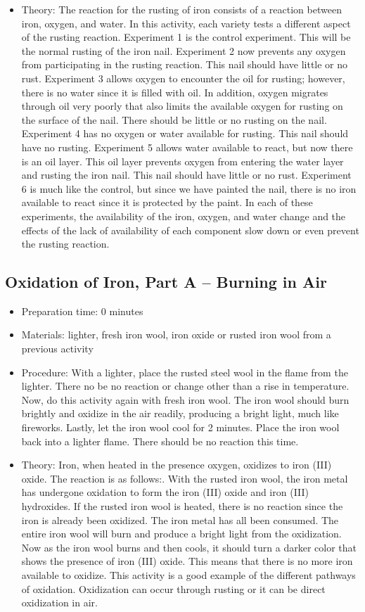 \begin{itemize}
\item{Theory: The reaction for the rusting of iron consists of a reaction between iron, oxygen, and water. In this activity, each variety tests a different aspect of the rusting reaction. Experiment 1 is the control experiment. This will be the normal rusting of the iron nail. Experiment 2 now prevents any oxygen from participating in the rusting reaction. This nail should have little or no rust. Experiment 3 allows oxygen to encounter the oil for rusting; however, there is no water since it is filled with oil. In addition, oxygen migrates through oil very poorly that also limits the available oxygen for rusting on the surface of the nail. There should be little or no rusting on the nail. Experiment 4 has no oxygen or water available for rusting. This nail should have no rusting. Experiment 5 allows water available to react, but now there is an oil layer. This oil layer prevents oxygen from entering the water layer and rusting the iron nail. This nail should have little or no rust. Experiment 6 is much like the control, but since we have painted the nail, there is no iron available to react since it is protected by the paint. In each of these experiments, the availability of the iron, oxygen, and water change and the effects of the lack of availability of each component slow down or even prevent the rusting reaction.}
\end{itemize}

\subsection{Oxidation of Iron, Part A – Burning in Air}
\begin{itemize}
\item{Preparation time: 0 minutes}
\item{Materials: lighter, fresh iron wool, iron oxide or rusted iron wool from a previous activity}
\item{Procedure: With a lighter, place the rusted steel wool in the flame from the lighter. There no be no reaction or change other than a rise in temperature. Now, do this activity again with fresh iron wool. The iron wool should burn brightly and oxidize in the air readily, producing a bright light, much like fireworks. Lastly, let the iron wool cool for 2 minutes. Place the iron wool back into a lighter flame. There should be no reaction this time.}
\item{Theory: Iron, when heated in the presence oxygen, oxidizes to iron (III) oxide. The reaction is as follows:. With the rusted iron wool, the iron metal has undergone oxidation to form the iron (III) oxide and iron (III) hydroxides. If the rusted iron wool is heated, there is no reaction since the iron is already been oxidized. The iron metal has all been consumed. The entire iron wool will burn and produce a bright light from the oxidization. Now as the iron wool burns and then cools, it should turn a darker color that shows the presence of iron (III) oxide. This means that there is no more iron available to oxidize. This activity is a good example of the different pathways of oxidation. Oxidization can occur through rusting or it can be direct oxidization in air. }
\end{itemize}

